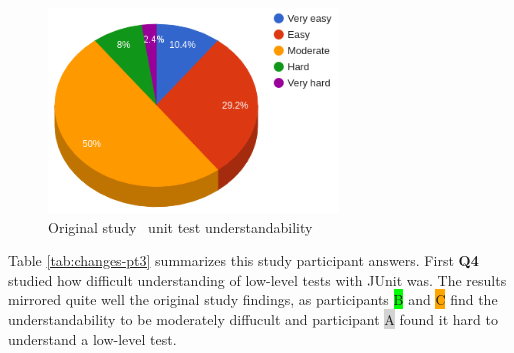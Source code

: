     \begin{figure}[ht]
      \begin{center}
        \includegraphics[width=7.7cm]{images/org-understandability.png}
        \caption{Original study~\cite{li2016automatically} unit test understandability}
        \label{fig:org-understandability}
      \end{center}
    \end{figure}

Table \ref{tab:changes-pt3} summarizes this study participant answers. First \textbf{Q4} studied how difficult understanding
of low-level tests with JUnit was. The results mirrored quite well the original study findings, as participants {\colorbox{lime}B} and {\colorbox{orange}C}
find the understandability to be moderately diffucult and participant {\colorbox{lightgray}A} found it hard to understand a low-level test.


    \begin{table}[H]
            \caption {Understandability of low-level tests and changes in it} \label{tab:changes-pt3}
    \end{table}

